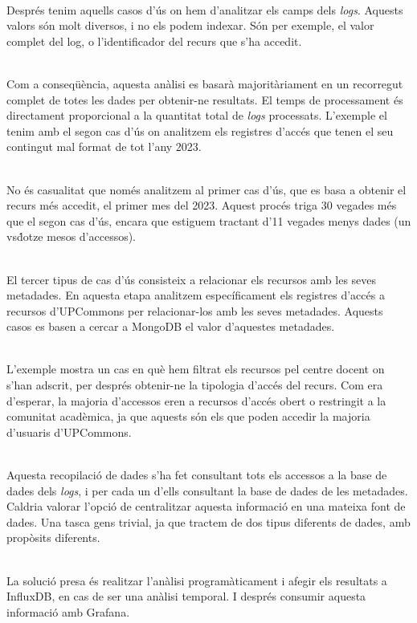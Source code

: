 \noindent \\
Després tenim aquells casos d'ús on hem d'analitzar els camps dels \textit{\gls{log}s}.
Aquests valors són molt diversos, i no els podem indexar.
Són per exemple, el valor complet del log, o l'identificador del recurs que s'ha accedit.

\noindent \\
Com a conseqüència, aquesta anàlisi es basarà majoritàriament en un recorregut complet de totes les dades per obtenir-ne resultats.
El temps de processament és directament proporcional a la quantitat total de \textit{\gls{log}s} processats.
L'exemple el tenim amb el segon cas d'ús on analitzem els registres d'accés que tenen el seu contingut mal format de tot l'any 2023.

\noindent \\
No és casualitat que només analitzem al primer cas d'ús, que es basa a obtenir el recurs més accedit, el primer mes del 2023.
Aquest procés triga 30 vegades més que el segon cas d'ús, encara que estiguem tractant d'11 vegades menys dades (un vs\. dotze mesos d'accessos).

\noindent \\
El tercer tipus de cas d'ús consisteix a relacionar els recursos amb les seves metadades.
En aquesta etapa analitzem específicament els registres d'accés a recursos d'\gls{UPCommons} per relacionar-los amb les seves metadades.
Aquests casos es basen a cercar a MongoDB el valor d'aquestes metadades.

\noindent \\
L'exemple mostra un cas en què hem filtrat els recursos pel centre docent on s'han adscrit, per després obtenir-ne la tipologia d'accés del recurs.
Com era d'esperar, la majoria d'accessos eren a recursos d'accés obert o restringit a la comunitat acadèmica, ja que aquests són els que poden accedir la majoria d'usuaris d'\gls{UPCommons}.

\noindent \\
Aquesta recopilació de dades s'ha fet consultant tots els accessos a la base de dades dels \textit{\gls{log}s}, i per cada un d'ells consultant la base de dades de les metadades.
Caldria valorar l'opció de centralitzar aquesta informació en una mateixa font de dades.
Una tasca gens trivial, ja que tractem de dos tipus diferents de dades, amb propòsits diferents.

\noindent \\
La solució presa és realitzar l'anàlisi programàticament i afegir els resultats a InfluxDB, en cas de ser una anàlisi temporal.
I després consumir aquesta informació amb Grafana.

